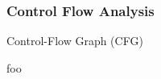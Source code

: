 
\subsubsection{Control Flow Analysis}
\label{sec:control_flow_analysis}

Control-Flow Graph (CFG)

foo

